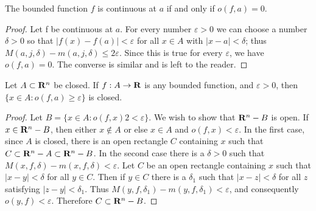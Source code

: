 \begin{theorem}
    The bounded function $f$ is continuous at $a$ if and only if $o(f, a)= 0$.
\end{theorem}

\begin{proof}
    Let f be continuous at $a$. For every number $\varepsilon > 0$  
    we can choose a number $\delta > 0$ so that $|f(x) - f(a)|< \varepsilon$ for
    all $x \in A$ with $|x - a| < \delta$; thus $M(a,j,\delta)-m(a,j,\delta) \le 2\varepsilon$.
    Since this is true for every $\varepsilon$, we have $o(f,a) = 0$.
    The converse is similar and is left to the reader. 
\end{proof}



\begin{theorem}
    Let $A\subset \mathbf{R}^n$ be closed. If $f:A\to \mathbf{R}$ is any bounded function, and $\varepsilon>0$, then 
    $\{x\in A: o(f, a)\ge \varepsilon\}$ is closed.
\end{theorem}

\begin{proof}
    Let $B = \{x \in A: o(f,x) 2<\varepsilon\}$. We wish to show that $\mathbf{R}^n-B$ is open. 
    If $x \in \mathbf{R}^n -B$, then either $x \notin A$ or else $x \in A$ and $o(f,x) < \varepsilon$.
    In the first case, since $A$ is closed, there is an open rectangle $C$ containing $x$ such that
    $C \subset \mathbf{R}^n - A\subset \mathbf{R}^n-B$. In the second case there is a $\delta > 0$ 
    such that $M(x,f,\delta) - m(x,f,\delta) < \varepsilon$. Let $C$ be an open
    rectangle containing $x$ such that $|x - y|<\delta$ for all $y\in C$.
    Then if $y \in C$ there is a $\delta_1$ such that $|x - z| < \delta$ for all $z$
    satisfying $|z - y| < \delta_1$. Thus $M(y,f,\delta_1) - m(y,f,\delta_1) < \varepsilon$, and
    consequently $o(y,f) < \varepsilon$. Therefore $C \subset \mathbf{R}^n-B$.
\end{proof}

